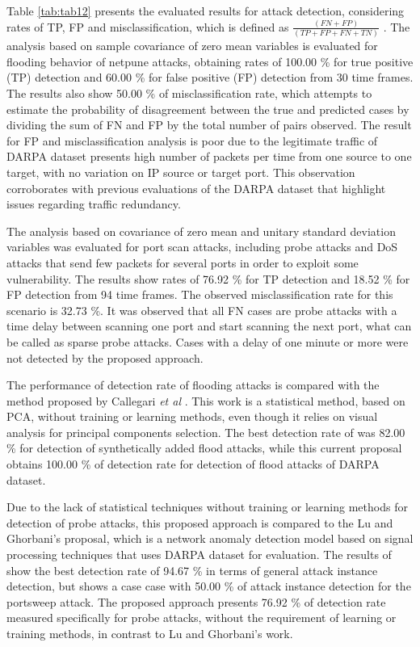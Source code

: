 Table \ref{tab:tab12} presents the evaluated results for attack detection, considering rates of TP, FP \cite{fleiss2013statistical} and misclassification, which is defined as $\frac{(FN+FP)}{(TP+FP+FN+TN)}$ \cite{bhuyan2014network}. The analysis based on sample covariance of zero mean variables is evaluated for flooding behavior of netpune attacks, obtaining rates of 100.00 \% for true positive (TP) detection and 60.00 \% for false positive (FP) detection from 30 time frames. The results also show 50.00 \% of misclassification rate, which attempts to estimate the probability of disagreement between the true and predicted cases by dividing the sum of FN and FP by the total number of pairs observed. The result for FP and misclassification analysis is poor due to the legitimate traffic of DARPA dataset presents high number of packets per time from one source to one target, with no variation on IP source or target port. This observation corroborates with previous evaluations of the DARPA dataset that highlight issues regarding traffic redundancy. 

The analysis based on covariance of zero mean and unitary standard deviation variables was evaluated for port scan attacks, including probe attacks and DoS attacks that send few packets for several ports in order to exploit some vulnerability. The results show rates of 76.92 \% for TP detection and 18.52 \% for FP detection from 94 time frames. The observed misclassification rate for this scenario is 32.73 \%. It was observed that all FN cases are probe attacks with a time delay between scanning one port and start scanning the next port, what can be called as sparse probe attacks. Cases with a delay of one minute or more were not detected by the proposed approach.

The performance of detection rate of flooding attacks is compared with the method proposed by Callegari \emph{et al} \cite{Zonglin2009}. This work is a statistical method, based on PCA, without training or learning methods, even though it relies on visual analysis for principal components selection. The best detection rate of \cite{Zonglin2009} was 82.00 \% for detection of synthetically added flood attacks, while this current proposal obtains 100.00 \% of detection rate for detection of flood attacks of DARPA dataset.

Due to the lack of statistical techniques without training or learning methods for detection of probe attacks, this proposed approach is compared to the Lu and Ghorbani's \cite{Lu2009} proposal, which is a network anomaly detection model based on signal processing techniques that uses DARPA dataset for evaluation. The results of \cite{Lu2009} show the best detection rate of 94.67 \% in terms of general attack instance detection, but shows a case case with 50.00 \% of attack instance detection for the portsweep attack. The proposed approach presents 76.92 \% of detection rate measured specifically for probe attacks, without the requirement of learning or training methods, in contrast to Lu and Ghorbani's \cite{Lu2009} work.


